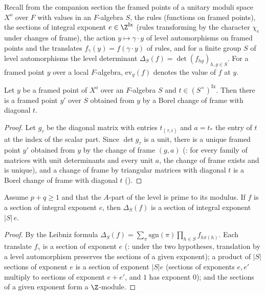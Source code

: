Recall from the companion section the framed points of a unitary moduli space $X^o$ over $F$ with values in an $F$-algebra
$S$, the rules (functions on framed points), the sections of integral exponent $e\in\Z^{\mathrm{Ix}}$ (rules transforming by
the character $\chi_e$ under changes of frame), the action $y\mapsto\gamma\cdot y$ of level automorphisms on framed points and
the translates $f_\gamma(y)=f(\gamma\cdot y)$ of rules, and for a finite group $S$ of level automorphisms the level determinant
$\Delta_S(f)=\det(f_{hg})_{h,g\in S}$. For a framed point $y$ over a local $F$-algebra, $\mathrm{ev}_y(f)$ denotes the
value of $f$ at $y$.

\begin{lemma}\label{pf:lift2:frbor}
Let $y$ be a framed point of $X^o$ over an $F$-algebra $S$ and $t\in(S^\times)^{\mathrm{Ix}}$. Then there is a framed point
$y'$ over $S$ obtained from $y$ by a Borel change of frame with diagonal $t$.
\end{lemma}

\begin{proof}
Let $g_\tau$ be the diagonal matrix with entries $t_{(\tau,i)}$ and $a=t_*$ the entry of $t$ at the index of the scalar part.
Since $\det g_\tau$ is a unit, there is a unique framed point $y'$ obtained from $y$ by the change of frame $(g,a)$
(: for every family of matrices with unit determinants and every unit $a$,
the change of frame exists and is unique), and a change of frame by triangular matrices with diagonal $t$ is a Borel
change of frame with diagonal $t$ ().
\end{proof}

\begin{lemma}\label{pf:lift2:levdet}
Assume $p+q\ge1$ and that the $A$-part of the level is prime to its modulus. If $f$ is a section of integral exponent $e$,
then $\Delta_S(f)$ is a section of integral exponent $|S|\,e$.
\end{lemma}

\begin{proof}
By the Leibniz formula $\Delta_S(f)=\sum_\pi\mathrm{sgn}(\pi)\prod_{h\in S}f_{h\pi(h)}$. Each translate $f_\gamma$ is a section of
exponent $e$ (: under the two hypotheses, translation by a level
automorphism preserves the sections of a given exponent); a product of $|S|$ sections of exponent $e$ is a section of
exponent $|S|e$ (sections of exponents $e,e'$ multiply to sections of exponent $e+e'$, and $1$ has exponent $0$); and the
sections of a given exponent form a $\Z$-module.
\end{proof}

